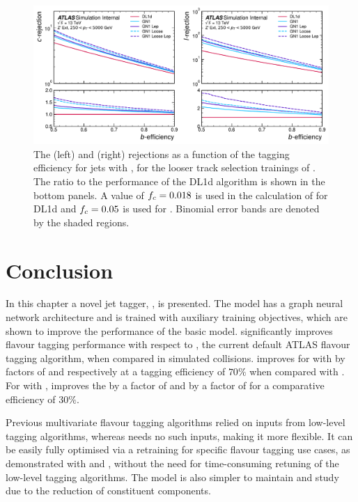 \begin{figure}[!p]
    \centering
    \includegraphics[width=\textwidth]{chapters/gnn_tagger/figs/gn1_loose_zprime.pdf}
    \caption{
        The \cjet (left) and \ljet (right) rejections as a function of the \bjet tagging efficiency for \Zprime jets with \Zprimept, for the looser track selection trainings of \GNN.
        The ratio to the performance of the DL1d algorithm is shown in the bottom panels.
        A value of $f_c = 0.018$ is used in the calculation of \Db for DL1d and $f_c = 0.05$ is used for \GNN.
        Binomial error bands are denoted by the shaded regions.
    }
    \label{fig:zprime_gn1_loose}
\end{figure}



\section{Conclusion}\label{sec:gnn_conclusion}


In this chapter a novel jet tagger, \GNN, is presented.
The model has a graph neural network architecture and is trained with auxiliary training objectives, which are shown to improve the performance of the basic model.
\GNN significantly improves flavour tagging performance with respect to \DLr, the current default ATLAS flavour tagging algorithm, when compared in simulated collisions.
\GNN improves \clrej for \ttbarjets with \ttbarpt by factors of \ttbclo and \ttbllo respectively at a \bjet tagging efficiency of $70\%$ when compared with \DLr.
For \Zprimejets with \Zprimept, \GNN improves the \crej by a factor of \zpbclo and \lrej by a factor of \zpbllo for a comparative \bjet efficiency of $30\%$.

Previous multivariate flavour tagging algorithms relied on inputs from low-level tagging algorithms, whereas \GNN needs no such inputs, making it more flexible. It can be easily fully optimised via a retraining for specific flavour tagging use cases, as demonstrated with \ctag and \highpt \btag, without the need for time-consuming retuning of the low-level tagging algorithms.
The model is also simpler to maintain and study due to the reduction of constituent components.

